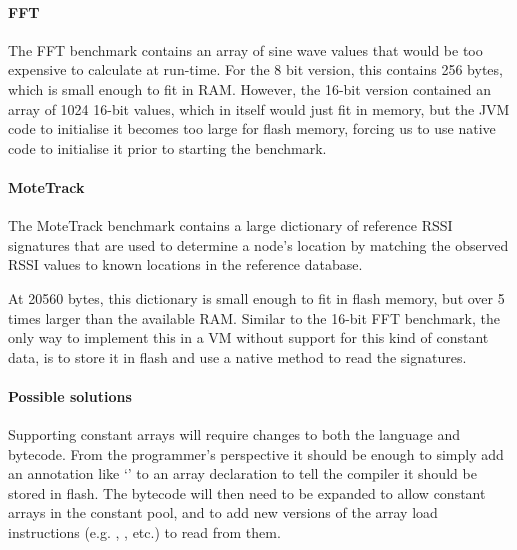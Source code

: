
\paragraph{FFT}
The FFT benchmark contains an array of sine wave values that would be too expensive to calculate at run-time. For the 8 bit version, this contains 256 bytes, which is small enough to fit in RAM. However, the 16-bit version contained an array of 1024 16-bit values, which in itself would just fit in memory, but the JVM code to initialise it becomes too large for flash memory, forcing us to use native code to initialise it prior to starting the benchmark.

\paragraph{MoteTrack}
The MoteTrack benchmark contains a large dictionary of reference RSSI signatures that are used to determine a node's location by matching the observed RSSI values to known locations in the reference database.

At 20560 bytes, this dictionary is small enough to fit in flash memory, but over 5 times larger than the available RAM. Similar to the 16-bit FFT benchmark, the only way to implement this in a VM without support for this kind of constant data, is to store it in flash and use a native method to read the signatures.

\paragraph{Possible solutions}
Supporting constant arrays will require changes to both the language and bytecode. From the programmer's perspective it should be enough to simply add an annotation like `' to an array declaration to tell the compiler it should be stored in flash. The bytecode will then need to be expanded to allow constant arrays in the constant pool, and to add new versions of the array load instructions (e.g. , , etc.) to read from them.





